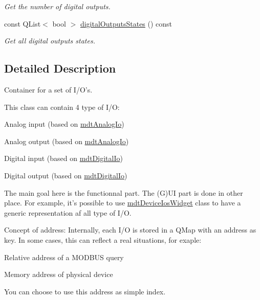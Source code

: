 \begin{DoxyCompactItemize}
\begin{DoxyCompactList}\small\item\em Get the number of digital outputs. \end{DoxyCompactList}\item 
\hypertarget{classmdt_device_ios_a13a10727750161e49c3a56917ceb1ffe}{
const QList$<$ bool $>$ \hyperlink{classmdt_device_ios_a13a10727750161e49c3a56917ceb1ffe}{digitalOutputsStates} () const }
\label{classmdt_device_ios_a13a10727750161e49c3a56917ceb1ffe}

\begin{DoxyCompactList}\small\item\em Get all digital outputs states. \end{DoxyCompactList}\end{DoxyCompactItemize}


\subsection{Detailed Description}
Container for a set of I/O's. 

This class can contain 4 type of I/O:
\begin{DoxyItemize}
\item Analog input (based on \hyperlink{classmdt_analog_io}{mdtAnalogIo})
\item Analog output (based on \hyperlink{classmdt_analog_io}{mdtAnalogIo})
\item Digital input (based on \hyperlink{classmdt_digital_io}{mdtDigitalIo})
\item Digital output (based on \hyperlink{classmdt_digital_io}{mdtDigitalIo})
\end{DoxyItemize}

The main goal here is the functionnal part. The (G)UI part is done in other place. For example, it's possible to use \hyperlink{classmdt_device_ios_widget}{mdtDeviceIosWidget} class to have a generic representation af all type of I/O.

Concept of address: Internally, each I/O is stored in a QMap with an address as key. In some cases, this can reflect a real situations, for exaple:
\begin{DoxyItemize}
\item Relative address of a MODBUS query
\item Memory address of physical device
\end{DoxyItemize}

You can choose to use this address as simple index. 

